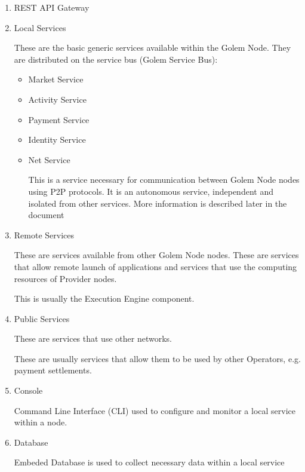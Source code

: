 \begin{enumerate}

\item REST API Gateway

\item Local Services

These are the basic generic services available within the Golem Node.
They are distributed on the service bus (Golem Service Bus):

\begin{itemize}

\item Market Service

\item Activity Service

\item Payment Service

\item Identity Service

\item Net Service

This is a service necessary for communication between Golem Node nodes using P2P protocols.
It is an autonomous service, independent and isolated from other services.
More information is described later in the document

\end{itemize}

\item Remote Services

These are services available from other Golem Node nodes. These are services that allow remote launch of
applications and services that use the computing resources of Provider nodes.

This is usually the Execution Engine component.

\item Public Services

These are services that use other networks.

These are usually services that allow them to be used by other Operators, e.g. payment settlements.

\item Console

Command Line Interface (CLI) used to configure and monitor a local service within a node.

\item Database

Embeded Database is used to collect necessary data within a local service

\end{enumerate}


